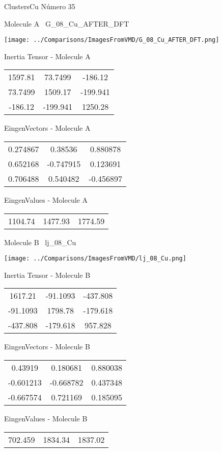 \vtab[-3cm]
\begin{center}
{\large ClustersCu \tab Número 35}
\end{center}
\begin{multicols}{2}
\begin{center}

Molecule A \
G\_08\_Cu\_AFTER\_DFT

\texttt{[image: ../Comparisons/ImagesFromVMD/G\_08\_Cu\_AFTER\_DFT.png]}

Inertia Tensor - Molecule A \\
\begin{tabular}{|c c c|}
1597.81	 & 	73.7499	 & 	-186.12	 \\
73.7499	 & 	1509.17	 & 	-199.941	 \\
-186.12	 & 	-199.941	 & 	1250.28
\end{tabular}

\vtab
 EingenVectors - Molecule A     \\
\begin{tabular}{|c c c|}
0.274867	 & 	0.38536	 & 	0.880878	 \\
0.652168	 & 	-0.747915	 & 	0.123691	 \\
0.706488	 & 	0.540482	 & 	-0.456897
\end{tabular}

\vtab
 EingenValues - Molecule A     \\
\begin{tabular}{|c c c|}
1104.74	 & 	1477.93	 & 	1774.59	 \\
\end{tabular}
\columnbreak

Molecule B \
lj\_08\_Cu

\texttt{[image: ../Comparisons/ImagesFromVMD/lj\_08\_Cu.png]}

Inertia Tensor - Molecule B \\
\begin{tabular}{|c c c|}
1617.21	 & 	-91.1093	 & 	-437.808	 \\
-91.1093	 & 	1798.78	 & 	-179.618	 \\
-437.808	 & 	-179.618	 & 	957.828
\end{tabular}

\vtab
 EingenVectors - Molecule B     \\
\begin{tabular}{|c c c|}
0.43919	 & 	0.180681	 & 	0.880038	 \\
-0.601213	 & 	-0.668782	 & 	0.437348	 \\
-0.667574	 & 	0.721169	 & 	0.185095
\end{tabular}

\vtab
 EingenValues - Molecule B     \\
\begin{tabular}{|c c c|}
702.459	 & 	1834.34	 & 	1837.02	 \\
\end{tabular}

\end{center}
\end{multicols}

